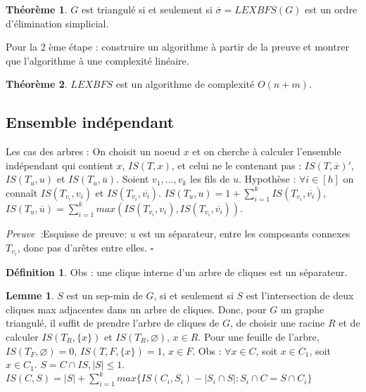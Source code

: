 \documentclass{book}
\theoremstyle{definition}
\newtheorem{lemma}{Lemme}
\newtheorem{theorem}{Théorème}
\newtheorem{definition}{Définition}
\numberwithin{lemma}{subsection}
\numberwithin{theorem}{subsection}
\numberwithin{definition}{subsection}
\numberwithin{proposition}{subsection}
\numberwithin{corollary}{subsection}
\numberwithin{property}{subsection}
\numberwithin{example}{subsection}
\numberwithin{heuristique}{subsection}
\numberwithin{scenario}{subsection}
\newenvironment{proofi} {\noindent\emph{Preuve~:}} {\hfill $\square$\vspace{0.2cm}}
\begin{document}

\begin{theorem}
 $G$ est triangulé si et seulement si $\overline{\sigma} = LEXBFS(G)$ est un ordre d'élimination simplicial.
\end{theorem}

Pour la 2 ème étape : construire un algorithme à partir de la preuve et montrer que l'algorithme à une complexité linéaire.

\begin{theorem}
 $LEXBFS$ est un algorithme de complexité $O(n+m)$.
\end{theorem}

\subsection{Ensemble indépendant}

Les cas des arbres : 
On choisit un noeud $x$ et on cherche à calculer l'ensemble indépendant qui contient $x$, $IS(T, x)$, et celui ne le contenant pas : $IS(T, \overline{x})'$, $IS(T_u, u)$ et $IS(T_u, \overline{u})$. Soient $v_1, ..., v_k$ les fils de $u$. Hypothèse : $\forall i \in [h]$ on connaît $IS(T_{v_i}, v_i)$ et $IS(T_{v_i}, \overline{v_i})$. $IS(T_u, u) = 1 + \sum_{i=1}^k IS(T_{v_i}, \overline{v_i})$, $IS(T_u, \overline{u}) = \sum_{i=1}^k max(IS(T_{v_i}, v_i), IS(T_{v_i}, \overline{v_i}))$.

\begin{proofi}{Esquisse de preuve:}
$u$ est un séparateur, entre les composants connexes $T_{v_i}$, donc pas d'arêtes entre elles.
\end{proofi}

\begin{definition}
Obs : une clique interne d'un arbre de cliques est un séparateur.
\end{definition}


\begin{lemma}
$S$ est un sep-min de $G$, si et seulement si $S$ est l'intersection de deux cliques max adjacentes dans un arbre de cliques. Donc, pour $G$ un graphe triangulé, il suffit de prendre l'arbre de cliques de $G$, de choisir une racine $R$ et de calculer $IS(T_R, \{x\})$ et $IS(T_R, \varnothing)$, $x \in R$. Pour une feuille de l'arbre, $IS(T_F, \varnothing) = 0$, $IS(T, F, \{ x \}) = 1$, $x \in F$.  
Obs : $\forall x \in C$, soit $x \in C_1$, soit $x \in C_1$.
$S = C \cap IS, |S| \leq 1$. $IS(C, S) = |S| + \sum_{i=1}^k max \{IS(C_i, S_i) - |S_i \cap S| : S_i \cap C = S \cap C_i \}$
\end{lemma}
\end{document}
